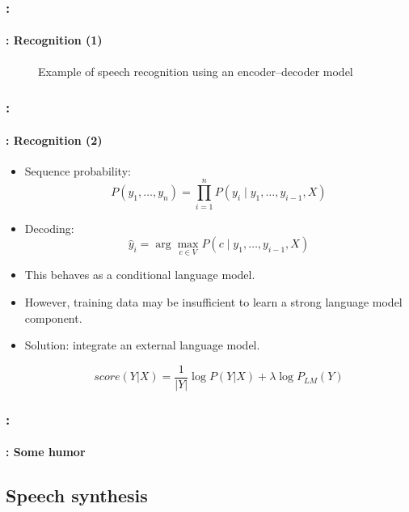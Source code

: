 \documentclass[xcolor=table]{beamer}
\begin{document}
\begin{frame}
	\frametitle{\insertshortsubtitle: \insertsection}
	\framesubtitle{\insertsubsection: Recognition (1)}
	
	\begin{figure}
		\centering
		\caption{Example of speech recognition using an encoder--decoder model \cite{2020-jurafsky-martin}}
	\end{figure}

\end{frame}

\begin{frame}
	\frametitle{\insertshortsubtitle: \insertsection}
	\framesubtitle{\insertsubsection: Recognition (2)}
	
	\begin{itemize}
		\item Sequence probability:
		\[
		P(y_1, \ldots, y_n) = \prod_{i=1}^n P(y_i \mid y_1, \ldots, y_{i-1}, X)
		\]
		
		\item Decoding:
		\[
		\hat{y}_i = \arg\max_{c \in V} P(c \mid y_1, \ldots, y_{i-1}, X)
		\]
		
		\item This behaves as a conditional language model.
		
		\item However, training data may be insufficient to learn a strong language model component.
		
		\item Solution: integrate an external language model.
		
		\[
		score(Y|X) = \frac{1}{|Y|} \log P(Y|X) + \lambda \log P_{LM}(Y)
		\]
	\end{itemize}
	
\end{frame}


\begin{frame}
	\frametitle{\insertshortsubtitle: \insertsection}
	\framesubtitle{\insertsubsection: Some humor}
	
		\begin{center}
		\end{center}
	
\end{frame}

\subsection{Speech synthesis}
\end{document}
